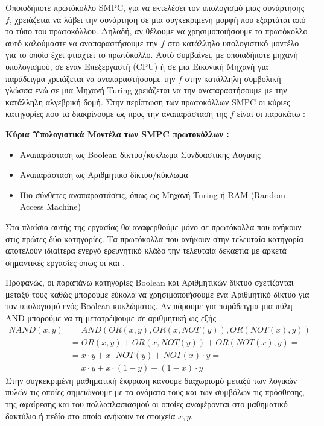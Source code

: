 Οποιοδήποτε πρωτόκολλο SMPC, για να εκτελέσει τον υπολογισμό μιας συνάρτησης $f$, χρειάζεται να λάβει την συνάρτηση σε μια συγκεκριμένη μορφή που εξαρτάται από το τύπο του πρωτοκόλλου. Δηλαδή, αν θέλουμε να χρησιμοποιήσουμε το πρωτόκολλο αυτό καλούμαστε να αναπαραστήσουμε την $f$ στο κατάλληλο υπολογιστικό μοντέλο για το οποίο έχει φτιαχτεί το πρωτόκολλο. Αυτό συμβαίνει, με οποιαδήποτε μηχανή υπολογισμού, σε έναν Επεξεργαστή (CPU) ή σε μια Εικονική Μηχανή για παράδειγμα χρειάζεται να αναπαραστήσουμε την $f$ στην κατάλληλη συμβολική γλώσσα ενώ σε μια Μηχανή Turing χρειάζεται να την αναπαραστήσουμε με την κατάλληλη αλγεβρική δομή. Στην περίπτωση των πρωτοκόλλων SMPC οι κύριες κατηγορίες που τα διακρίνουμε ως προς την αναπαράσταση της $f$ είναι οι παρακάτω :

\begin{definition}
\textbf{Κύρια Υπολογιστικά Μοντέλα των SMPC πρωτοκόλλων :}
\begin{itemize}
    \item Αναπαράσταση ως Boolean δίκτυο/κύκλωμα Συνδυαστικής Λογικής
    \item Αναπαράσταση ως Αριθμητικό δίκτυο/κύκλωμα
    \item Πιο σύνθετες αναπαραστάσεις, όπως ως Μηχανή Turing ή RAM (Random Access Machine)
\end{itemize}
\end{definition}

Στα πλαίσια αυτής της εργασίας θα αναφερθούμε μόνο σε πρωτόκολλα που ανήκουν στις πρώτες δύο κατηγορίες. Τα πρωτόκολλα που ανήκουν στην τελευταία κατηγορία αποτελούν ιδιαίτερα ενεργό ερευνητικό κλάδο την τελευταία δεκαετία με αρκετά σημαντικές εργασίες όπως οι \cite{cryptoeprint:2014/082} και \cite{goldwasser2013run}.

Προφανώς, οι παραπάνω κατηγορίες Boolean και Αριθμητικών δίκτυο σχετίζονται μεταξύ τους καθώς μπορούμε εύκολα να χρησιμοποιήσουμε ένα Αριθμητικό δίκτυο για τον υπολογισμό ενός Boolean κυκλώματος. Αν πάρουμε για παράδειγμα μια πύλη AND μπορούμε να τη μετατρέψουμε σε αριθμητική ως εξής :
%
\[
\begin{aligned}
    NAND(x, y)  &= AND(OR(x,y), OR(x,NOT(y)), OR(NOT(x),y)) =\\
                &= OR(x,y) + OR(x,NOT(y)) + OR(NOT(x),y) =\\
                &= x \cdot y + x \cdot NOT(y) + NOT(x) \cdot y =\\
                &= x \cdot y + x \cdot (1-y) + (1-x) \cdot y
\end{aligned}
\]
%
Στην συγκεκριμένη μαθηματική έκφραση κάνουμε διαχωρισμό μεταξύ των λογικών πυλών τις οποίες σημειώνουμε με τα ονόματα τους και των συμβόλων τις πρόσθεσης, της αφαίρεσης και του πολλαπλασιασμού οι οποίες αναφέρονται στο μαθηματικό δακτύλιο ή πεδίο στο οποίο ανήκουν τα στοιχεία $x,y$.

